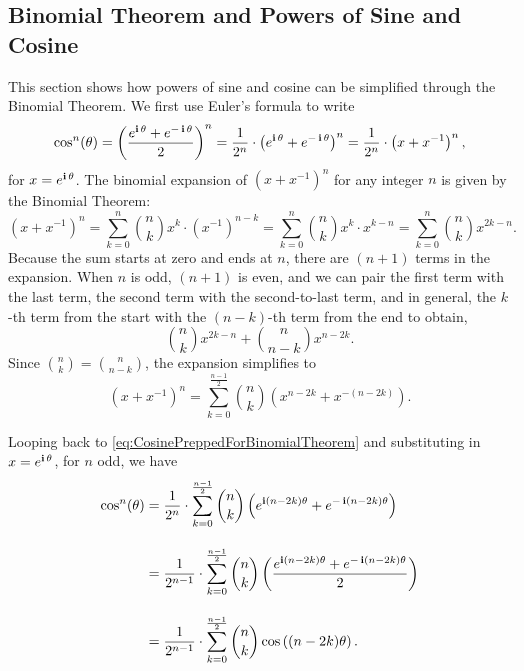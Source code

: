 \subsection{Binomial Theorem and Powers of Sine and Cosine}
\label{sec:BinomialEulerFormula}

This section shows how powers of sine and cosine can be simplified through the Binomial Theorem. We first use Euler's formula to write 
\begin{equation}
\label{eq:CosinePreppedForBinomialTheorem}
    \cos^n(\theta) = \left( \frac{ e^{\mathop{\bm{\mathrm i}} \theta} + e^{-\mathop{\bm{\mathrm i}} \theta} }{2} \right)^n = 
\frac{1}{2^n} \cdot \left( e^{\mathop{\bm{\mathrm i}} \theta} + e^{-\mathop{\bm{\mathrm i}} \theta}  \right)^n = 
\frac{1} {2^n} \cdot \left( x + x^{-1}  \right)^n,
\end{equation} 
for $x =e^{\mathop{\bm{\mathrm i}} \theta}$. The binomial expansion of \( \left(x +x^{-1}\right)^n \) for any integer \( n \) is given by the Binomial Theorem:
\begin{equation}
    \left(x +  x^{-1}\right)^n = \sum_{k=0}^{n} \binom{n}{k} x^k \cdot  \left( x^{-1}\right)^{n-k} = \sum_{k=0}^{n} \binom{n}{k} x^k \cdot  x^{k-n} = \sum_{k=0}^{n} \binom{n}{k} x^{2k-n}.
\end{equation}
Because the sum starts at zero and ends at $n$, there are $(n+1)$ terms in the expansion.  When \( n \) is odd, $(n+1)$ is even, and we can pair the first term with the last term, the second term with the second-to-last term, and in general, the \( k \)-th term from the start with the \( (n-k) \)-th term from the end to obtain,
\begin{equation}
    \binom{n}{k} x^{2k-n} + \binom{n}{n-k} x^{n-2k}.
\end{equation}
Since \( \binom{n}{k} = \binom{n}{n-k} \), the expansion simplifies to
\begin{equation}
    \left(x + x^{-1} \right)^n = \sum_{k=0}^{\frac{n-1}{2}} \binom{n}{k} \left( x^{n-2k} + x^{-(n-2k)}\right).
\end{equation}

Looping back to \eqref{eq:CosinePreppedForBinomialTheorem} and substituting in $x =e^{\mathop{\bm{\mathrm i}} \theta}$, for $n$ odd, we have
\begin{align*}
    \cos^n(\theta) &= \frac{1} {2^{n}} \cdot \sum_{k=0}^{\frac{n-1}{2}} \binom{n}{k}\left(  e^{\mathop{\bm{\mathrm i}}(n-2k)\theta} + e^{-\mathop{\bm{\mathrm i}}(n-2k)\theta}  \right) \\[1em]
    &= \frac{1} {2^{n-1}} \cdot \sum_{k=0}^{\frac{n-1}{2}} \binom{n}{k}\left( \frac{ e^{\mathop{\bm{\mathrm i}}(n-2k)\theta} + e^{-\mathop{\bm{\mathrm i}}(n-2k)\theta} }{2} \right) \\[1em]
    & = \frac{1} {2^{n-1}} \cdot \sum_{k=0}^{\frac{n-1}{2}} \binom{n}{k} \cos\left((n-2k) \theta \right).
\end{align*}



